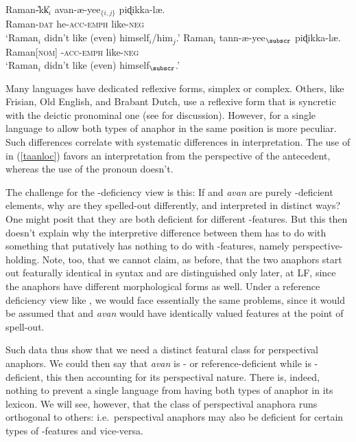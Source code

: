 \documentclass[output=paper, modfonts, nonflat]{langsci/langscibook}
\begin{document}
\ea\label{avanloc}\gll Raman-\U{}kk\U{}$_i$ avan-æ-yee$_{\{i,j\}}$ piɖikka-læ.\\
Raman-{\scshape dat} he-{\scshape acc-emph} like-{\scshape neg}\\
\glt `Raman$_i$ didn't like (even) himself$_i$/him$_j$.'
\ex\label{taanloc}\gll Raman$_i$ tann-æ-yee$_\subscr$ piɖikka-læ.\\
Raman[{\scshape nom}] \anaph-{\scshape acc-emph} like-{\scshape neg}\\
\glt `Raman$_i$ didn't like (even) himself$_\subscr$.'  \z

\noindent Many languages have dedicated reflexive forms, simplex or
complex. Others, like Frisian, Old English, and Brabant Dutch, use a
reflexive form that is syncretic with the deictic pronominal one (see
\citealt{roorwyn:2011} for discussion). However, for a single language
to allow both types of anaphor in the same position is more
peculiar. Such differences correlate with systematic differences in
interpretation. The use of \taan{} in (\ref{taanloc}) favors
an interpretation from the perspective of the antecedent, whereas the
use of the pronoun doesn't.

The challenge for the \ph-deficiency view is this: If \taan{} and
\textit{avan} are purely \ph-deficient elements, why are they
spelled-out differently, and interpreted in distinct ways?  One might
posit that they are both deficient for different \ph-features. But
this then doesn't explain why the interpretive difference between them
has to do with something that putatively has nothing to do with
\ph-features, namely perspective-holding. Note, too, that we cannot
claim, as before, that the two anaphors start out featurally identical
in syntax and are distinguished only later, at LF, since the anaphors
have different morphological forms as well. Under a reference
deficiency view like \citet{Hicks:2009}, we would face essentially the
same problems, since it would be assumed that \taan{} and
\textit{avan} would have identically valued \var{} features at the
point of spell-out.

Such data thus show that we need a distinct featural class for
perspectival anaphors. We could then say that \textit{avan} is \ph- or
reference-deficient while \taan{} is \dep-deficient, this then
accounting for its perspectival nature. There is, indeed, nothing to
prevent a single language from having both types of anaphor in its
lexicon. We will see, however, that the class of perspectival anaphora
runs orthogonal to others: i.e.\ perspectival anaphors may also be
deficient for certain types of \ph-features and vice-versa.
\end{document}
